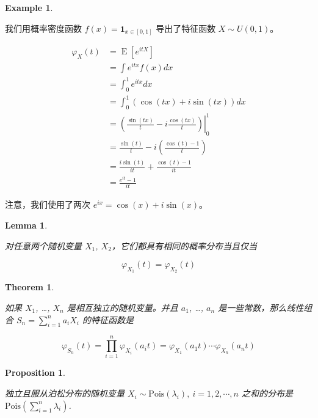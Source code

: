 \documentclass[
  12pt,
]{krantz}
\newtheorem{theorem}{Theorem}[chapter]
\newtheorem{lemma}{Lemma}[chapter]
\newtheorem{proposition}{Proposition}[chapter]
\theoremstyle{definition}
\theoremstyle{definition}
\newtheorem{example}{Example}[chapter]
\theoremstyle{definition}
\theoremstyle{definition}
\theoremstyle{remark}
\begin{document}
\begin{example}
\protect\hypertarget{exm:unlabeled-div-2}{}\label{exm:unlabeled-div-2}

我们用概率密度函数 \(f(x)=\mathbf{1}_{x \in [0,1]}\) 导出了特征函数 \(X\sim U(0,1)\)。

\begin{equation*}
\begin{split}
\varphi _{X}(t) &= \operatorname {E} \left[e^{itX}\right]\\
 & =\int e^{itx}f(x)dx\\
 & =\int_{0}^{1}e^{itx}dx\\
 & =\int_{0}^{1}\left(\cos(tx)+i\sin(tx)\right)dx\\
 & =\left.\left(\frac{\sin(tx)}{t}-i\frac{\cos(tx)}{t}\right)\right|_{0}^{1}\\
 & =\frac{\sin(t)}{t}-i\left(\frac{\cos(t)-1}{t}\right)\\
 & =\frac{i\sin(t)}{it}+\frac{\cos(t)-1}{it}\\
 & =\frac{e^{it}-1}{it}
\end{split}
\end{equation*}

注意，我们使用了两次 \(e^{ix}=\cos(x)+i\sin(x)\)。

\end{example}

\begin{lemma}
\protect\hypertarget{lem:chf-pdf}{}\label{lem:chf-pdf}

对任意两个随机变量 \(X_1\), \(X_2\)，它们都具有相同的概率分布当且仅当

\[\varphi _{X_1}(t)=\varphi _{X_2}(t)\]

\end{lemma}

\begin{theorem}
\protect\hypertarget{thm:chf-sum}{}\label{thm:chf-sum}

如果 \(X_1\), \ldots, \(X_n\) 是相互独立的随机变量。并且 \(a_1\), \ldots, \(a_n\) 是一些常数，那么线性组合 \(S_n=\sum_{i=1}^na_iX_i\) 的特征函数是

\[\varphi _{S_{n}}(t)=\prod_{i=1}^n\varphi _{X_i}(a_{i}t)=\varphi _{X_{1}}(a_{1}t)\cdots \varphi _{X_{n}}(a_{n}t)\]

\end{theorem}

\begin{proposition}
\protect\hypertarget{prp:unlabeled-div-3}{}\label{prp:unlabeled-div-3}

独立且服从泊松分布的随机变量 \(X_i \sim \mathrm{Pois}(\lambda_i),\: i=1,2,\cdots,n\) 之和的分布是 \(\mathrm{Pois}(\sum_{i=1}^n\lambda_i)\).

\end{proposition}
\end{document}
